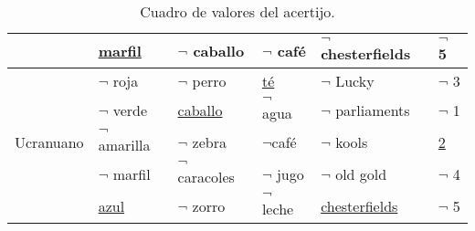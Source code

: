 \documentclass[spanish,12pt,letterpaper]{article}
\begin{document}
\begin{table}[htbp]
\begin{center}
\begin{tabular}{|l|l|l|l|l|l|}
      &\underline{marfil} &$\neg$ caballo&$\neg$ café&$\neg$ chesterfields&$\neg$ 5\\\hline
      &$\neg$ roja &$\neg$ perro &\underline{té} &$\neg$ Lucky &$\neg$ 3\\
      &$\neg$ verde&\underline{caballo} &$\neg$ agua &$\neg$ parliaments &$\neg$ 1\\
      Ucranuano &$\neg$ amarilla &$\neg$ zebra &$\neg$café &$\neg$ kools &\underline{2}\\
      &$\neg$ marfil &$\neg$ caracoles &$\neg$ jugo&$\neg$ old gold &$\neg$ 4\\
      &\underline{azul} &$\neg$ zorro &$\neg$ leche&\underline{chesterfields}&$\neg$ 5\\\hline
    \end{tabular}
    \caption{Cuadro de valores del acertijo.}
    \label{tabla:sencilla}
  \end{center}
\end{table}
\end{document}
